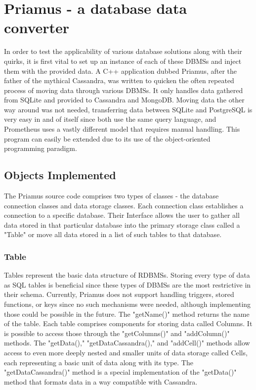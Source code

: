 \chapter{Priamus - a database data converter}
\label{ch:background}
\par In order to test the applicability of various database solutions along with their quirks, it is first vital to set up an instance of each of these DBMSs and inject them with the provided data. A C++ application dubbed Priamus, after the father of the mythical Cassandra, was written to quicken the often repeated process of moving data through various DBMSs. It only handles data gathered from SQLite and provided to Cassandra and MongoDB. Moving data the other way around was not needed, transferring data between SQLite and PostgreSQL is very easy in and of itself since both use the same query language, and Prometheus uses a vastly different model that requires manual handling. This program can easily be extended due to its use of the object-oriented programming paradigm.

\section{Objects Implemented}
\label{sec:background:first_section}
\par The Priamus source code comprises two types of classes - the database connection classes and data storage classes. Each connection class establishes a connection to a specific database. Their Interface allows the user to gather all data stored in that particular database into the primary storage class called a "Table" or move all data stored in a list of such tables to that database.

\subsection{Table}




\par Tables represent the basic data structure of RDBMSs. Storing every type of data as SQL tables is beneficial since these types of DBMSs are the most restrictive in their schema. Currently, Priamus does not support handling triggers, stored functions, or keys since no such mechanisms were needed, although implementing those could be possible in the future. The "getName()" method returns the name of the table. Each table comprises components for storing data called Columns. It is possible to access those through the "getColumns()" and "addColumn()" methods. The "getData()," "getDataCassandra()," and "addCell()" methods allow access to even more deeply nested and smaller units of data storage called Cells, each representing a basic unit of data along with its type. The "getDataCassandra()" method is a special implementation of the "getData()" method that formats data in a way compatible with Cassandra.

